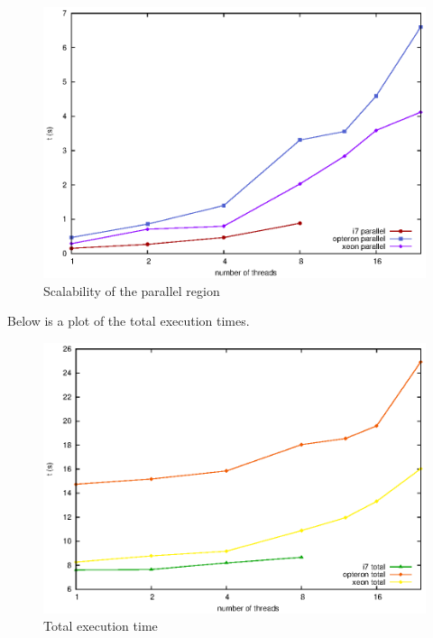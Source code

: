 \documentclass[a4paper,10pt,openright,openbib,twocolumn]{article}
\begin{document}
\begin{figure}[!htp]
    \centering
    \begin{minipage}[t]{\columnwidth}
        \includegraphics[width=\textwidth]{slides/images/parallel.eps}
        \caption{Scalability of the parallel region \label{fig:parallel}}
    \end{minipage}
\end{figure}

Below is a plot of the total execution times.


\begin{figure}[!htp]
    \centering
    \begin{minipage}[t]{\columnwidth}
        \includegraphics[width=\textwidth]{slides/images/total.eps}
        \caption{Total execution time \label{fig:total}}
    \end{minipage}
\end{figure}
\end{document}
